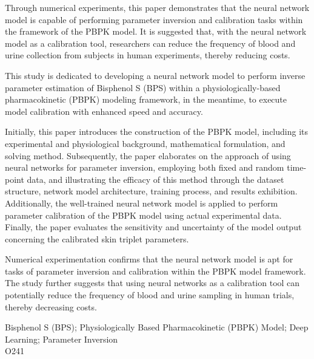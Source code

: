 \documentclass[a4paper,punct=banjiao,twoside]{ctexrep}
\theoremstyle{plain}
\theoremstyle{definition}
\theoremstyle{remark}
\begin{document}
Through numerical experiments, this paper demonstrates that the neural network model is capable of performing parameter inversion and calibration tasks within the framework of the PBPK model. It is suggested that, with the neural network model as a calibration tool, researchers can reduce the frequency of blood and urine collection from subjects in human experiments, thereby reducing costs.
\fi

This study is dedicated to developing a neural network model to perform inverse parameter estimation of Bisphenol S (BPS) within a 
physiologically-based pharmacokinetic (PBPK) modeling framework, in the meantime,  to execute model calibration with enhanced speed and accuracy.

Initially, this paper introduces the construction of the PBPK model, including its experimental and physiological background, 
 mathematical formulation, and solving method. Subsequently, the paper elaborates on the approach of using neural networks for 
 parameter inversion, employing both fixed and random time-point data, and illustrating the efficacy of this method through the dataset structure,
  network model architecture, training process, and results exhibition. 
  Additionally, the well-trained neural network model is applied to perform parameter calibration of the PBPK model using actual experimental data. 
  Finally, the paper evaluates the sensitivity and uncertainty of the model output concerning the calibrated skin triplet parameters.
  
  Numerical experimentation confirms that the neural network model is apt for tasks of parameter inversion and calibration within the PBPK model 
  framework. The study further suggests that using neural networks as a calibration tool can potentially reduce the frequency of blood and urine 
  sampling in human trials, thereby decreasing costs.


 Bisphenol S (BPS); Physiologically Based Pharmacokinetic (PBPK) Model; Deep Learning; Parameter Inversion\\
 O241

\clearpage
\mbox{}
\thispagestyle{empty}




\renewcommand{\thepage}{\arabic{page}}
\setcounter{page}{0}
\end{document}
